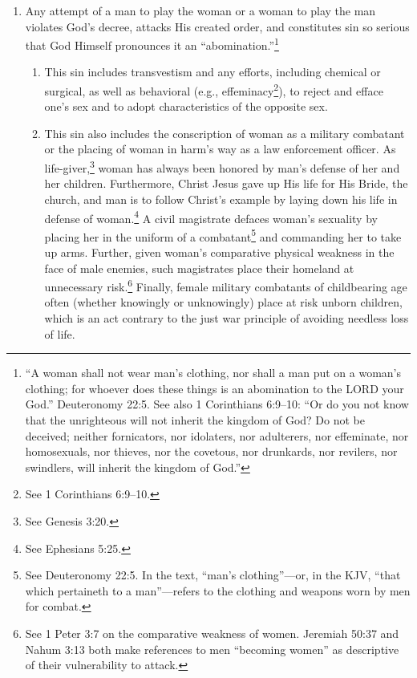 \documentclass[
]{book}
\providecommand{\tightlist}{%
  \setlength{\itemsep}{0pt}\setlength{\parskip}{0pt}}
\begin{document}
\begin{enumerate}
\item
  Any attempt of a man to play the woman or a woman to play the man violates God's decree, attacks His created order, and constitutes sin so serious that God Himself pronounces it an ``abomination.''\footnote{``A woman shall not wear man's clothing, nor shall a man put on a woman's clothing; for whoever does these things is an abomination to the LORD your God.'' Deuteronomy 22:5. See also 1 Corinthians 6:9--10: ``Or do you not know that the unrighteous will not inherit the kingdom of God? Do not be deceived; neither fornicators, nor idolaters, nor adulterers, nor effeminate, nor homosexuals, nor thieves, nor the covetous, nor drunkards, nor revilers, nor swindlers, will inherit the kingdom of God.''}

  \begin{enumerate}
  \def\labelenumii{\alph{enumii}.}
  \tightlist
  \item
    This sin includes transvestism and any efforts, including chemical or surgical, as well as behavioral (e.g., effeminacy\footnote{See 1 Corinthians 6:9--10.}), to reject and efface one's sex and to adopt characteristics of the opposite sex.\\
  \item
    This sin also includes the conscription of woman as a military combatant or the placing of woman in harm's way as a law enforcement officer. As life-giver,\footnote{See Genesis 3:20.} woman has always been honored by man's defense of her and her children. Furthermore, Christ Jesus gave up His life for His Bride, the church, and man is to follow Christ's example by laying down his life in defense of woman.\footnote{See Ephesians 5:25.} A civil magistrate defaces woman's sexuality by placing her in the uniform of a combatant\footnote{See Deuteronomy 22:5. In the text, ``man's clothing''---or, in the KJV, ``that which pertaineth to a man''---refers to the clothing and weapons worn by men for combat.} and commanding her to take up arms. Further, given woman's comparative physical weakness in the face of male enemies, such magistrates place their homeland at unnecessary risk.\footnote{See 1 Peter 3:7 on the comparative weakness of women. Jeremiah 50:37 and Nahum 3:13 both make references to men ``becoming women'' as descriptive of their vulnerability to attack.} Finally, female military combatants of childbearing age often (whether knowingly or unknowingly) place at risk unborn children, which is an act contrary to the just war principle of avoiding needless loss of life.
  \end{enumerate}
\end{enumerate}
\end{document}
